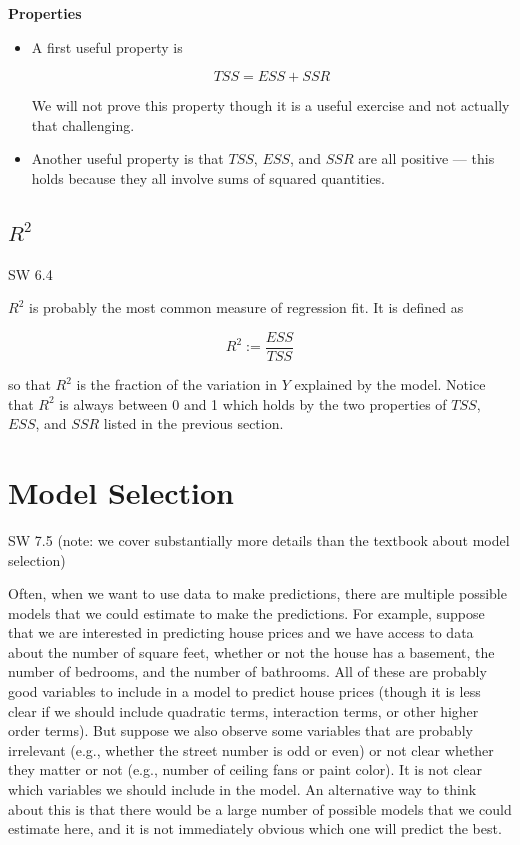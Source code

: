 \documentclass[
  letterpaper,
  DIV=11,
  numbers=noendperiod]{scrreprt}
\begin{document}
\textbf{Properties}

\begin{itemize}
\item
  A first useful property is

  \[
      TSS = ESS + SSR
    \]

  We will not prove this property though it is a useful exercise and not
  actually that challenging.
\item
  Another useful property is that \(TSS\), \(ESS\), and \(SSR\) are all
  positive --- this holds because they all involve sums of squared
  quantities.
\end{itemize}

\subsection{\texorpdfstring{\(R^2\)}{R\^{}2}}\label{r2}

SW 6.4

\(R^2\) is probably the most common measure of regression fit. It is
defined as

\[
  R^2 := \frac{ESS}{TSS}
\]

so that \(R^2\) is the fraction of the variation in \(Y\) explained by
the model. Notice that \(R^2\) is always between 0 and 1 which holds by
the two properties of \(TSS\), \(ESS\), and \(SSR\) listed in the
previous section.

\section{Model Selection}\label{model-selection-1}

SW 7.5 (note: we cover substantially more details than the textbook
about model selection)

Often, when we want to use data to make predictions, there are multiple
possible models that we could estimate to make the predictions. For
example, suppose that we are interested in predicting house prices and
we have access to data about the number of square feet, whether or not
the house has a basement, the number of bedrooms, and the number of
bathrooms. All of these are probably good variables to include in a
model to predict house prices (though it is less clear if we should
include quadratic terms, interaction terms, or other higher order
terms). But suppose we also observe some variables that are probably
irrelevant (e.g., whether the street number is odd or even) or not clear
whether they matter or not (e.g., number of ceiling fans or paint
color). It is not clear which variables we should include in the model.
An alternative way to think about this is that there would be a large
number of possible models that we could estimate here, and it is not
immediately obvious which one will predict the best.
\end{document}
